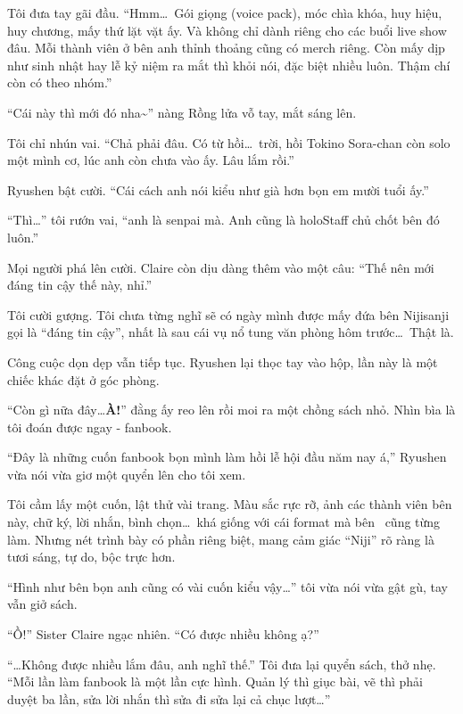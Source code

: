 \documentclass[../main.tex]{subfiles}
\begin{document}
Tôi đưa tay gãi đầu. ``Hmm\dots\ Gói giọng (voice pack), móc chìa khóa, huy hiệu, huy chương, mấy thứ lặt vặt ấy. Và không chỉ dành riêng cho các buổi live show đâu. Mỗi thành viên ở bên anh thỉnh thoảng cũng có merch riêng. Còn mấy dịp như sinh nhật hay lễ kỷ niệm ra mắt thì khỏi nói, đặc biệt nhiều luôn. Thậm chí còn có theo nhóm.''

``Cái này thì mới đó nha\~{}'' nàng Rồng lửa vỗ tay, mắt sáng lên.

Tôi chỉ nhún vai. ``Chả phải đâu. Có từ hồi\dots\ trời, hồi Tokino Sora-chan còn solo một mình cơ, lúc anh còn chưa vào ấy. Lâu lắm rồi.''

Ryushen bật cười. ``Cái cách anh nói kiểu như già hơn bọn em mười tuổi ấy.''

``Thì\dots'' tôi rướn vai, ``anh là senpai mà. Anh cũng là holoStaff chủ chốt bên đó luôn.''

Mọi người phá lên cười. Claire còn dịu dàng thêm vào một câu: ``Thế nên mới đáng tin cậy thế này, nhỉ.''

Tôi cười gượng. Tôi chưa từng nghĩ sẽ có ngày mình được mấy đứa bên Nijisanji gọi là ``đáng tin cậy'', nhất là sau cái vụ nổ tung văn phòng hôm trước\dots\ Thật là.

\ct

Công cuộc dọn dẹp vẫn tiếp tục. Ryushen lại thọc tay vào hộp, lần này là một chiếc khác đặt ở góc phòng.

``Còn gì nữa đây\dots \textbf{À!}'' đằng ấy reo lên rồi moi ra một chồng sách nhỏ. Nhìn bìa là tôi đoán được ngay - fanbook.


``Đây là những cuốn fanbook bọn mình làm hồi lễ hội đầu năm nay á,'' Ryushen vừa nói vừa giơ một quyển lên cho tôi xem.

Tôi cầm lấy một cuốn, lật thử vài trang. Màu sắc rực rỡ, ảnh các thành viên bên này, chữ ký, lời nhắn, bình chọn\dots\ khá giống với cái format mà bên \hll\ cũng từng làm. Nhưng nét trình bày có phần riêng biệt, mang cảm giác ``Niji'' rõ ràng là tươi sáng, tự do, bộc trực hơn.

``Hình như bên bọn anh cũng có vài cuốn kiểu vậy\dots'' tôi vừa nói vừa gật gù, tay vẫn giở sách.

``Ồ!'' Sister Claire ngạc nhiên. ``Có được nhiều không ạ?''

``\dots Không được nhiều lắm đâu, anh nghĩ thế.'' Tôi đưa lại quyển sách, thở nhẹ. ``Mỗi lần làm fanbook là một lần cực hình. Quản lý thì giục bài, vẽ thì phải duyệt ba lần, sửa lời nhắn thì sửa đi sửa lại cả chục lượt\dots''
\end{document}
